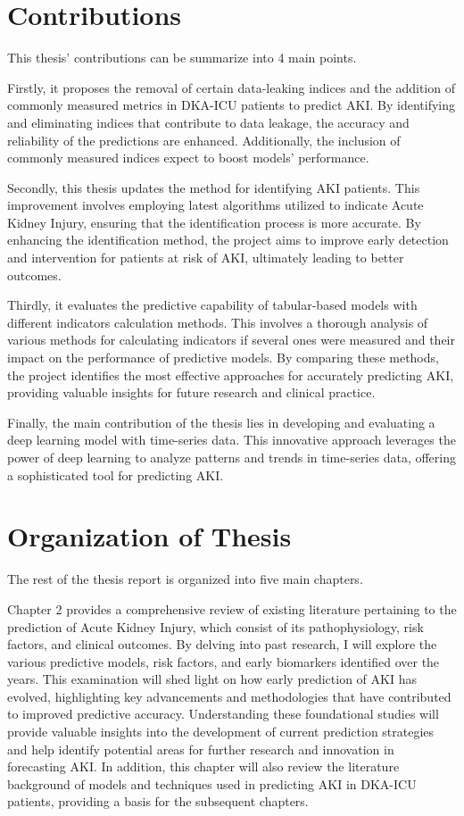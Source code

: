 \documentclass[../main.tex]{subfiles}
\begin{document}
\section{Contributions}

This thesis' contributions can be summarize into 4 main points.

Firstly, it proposes the removal of certain data-leaking indices and the addition of commonly measured metrics in DKA-ICU patients to predict AKI. 
By identifying and eliminating indices that contribute to data leakage, the accuracy and reliability of the predictions are enhanced. 
Additionally, the inclusion of commonly measured indices expect to boost models' performance.

Secondly, this thesis updates the method for identifying AKI patients. This improvement involves employing latest algorithms utilized to indicate Acute Kidney Injury, ensuring that the identification process is more accurate.
By enhancing the identification method, the project aims to improve early detection and intervention for patients at risk of AKI, ultimately leading to better outcomes.

Thirdly, it evaluates the predictive capability of tabular-based models with different indicators calculation methods. 
This involves a thorough analysis of various methods for calculating indicators if several ones were measured and their impact on the performance of predictive models. 
By comparing these methods, the project identifies the most effective approaches for accurately predicting AKI, providing valuable insights for future research and clinical practice.

Finally, the main contribution of the thesis lies in developing and evaluating a deep learning model with time-series data.
This innovative approach leverages the power of deep learning to analyze patterns and trends in time-series data, offering a sophisticated tool for predicting AKI.

\section{Organization of Thesis}
The rest of the thesis report is organized into five main chapters.

Chapter 2 provides a comprehensive review of existing literature pertaining to the prediction of Acute Kidney Injury,  which consist of its pathophysiology, risk factors, and clinical outcomes.
By delving into past research, I will explore the various predictive models, risk factors, and early biomarkers identified over the years.
This examination will shed light on how early prediction of AKI has evolved, highlighting key advancements and methodologies that have contributed to improved predictive accuracy.
Understanding these foundational studies will provide valuable insights into the development of current prediction strategies and help identify potential areas for further research and innovation in forecasting AKI.
In addition, this chapter will also review the literature background of models and techniques used in predicting AKI in DKA-ICU patients, providing a basis for the subsequent chapters.
\end{document}
